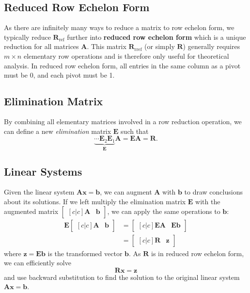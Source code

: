 \documentclass{article}
\begin{document}
\subsection{Reduced Row Echelon Form}
As there are infinitely many ways to reduce a matrix to row echelon
form, we typically reduce \(\symbf{R}_{\mathrm{ref}}\) further into
\textbf{reduced row echelon form} which is a unique reduction for all
matrices \(\symbf{A}\). This matrix \(\symbf{R}_{\mathrm{rref}}\) (or
simply \(\symbf{R}\)) generally requires \(m \times n\) elementary row
operations and is therefore only useful for theoretical analysis. In
reduced row echelon form, all entries in the same column as a pivot
must be 0, and each pivot must be 1.
\subsection{Elimination Matrix}
By combining all elementary matrices involved in a row reduction
operation, we can define a new \textit{elimination} matrix
\(\symbf{E}\) such that
\begin{equation*}
    \underbrace{\cdots \symbf{E}_2 \symbf{E}_1}_{\symbf{E}} \symbf{A} = \symbf{E} \symbf{A} = \symbf{R}.
\end{equation*}
\subsection{Linear Systems}
Given the linear system \(\symbf{A} \symbf{x} = \symbf{b}\), we can
augment \(\symbf{A}\) with \(\symbf{b}\) to draw conclusions about its
solutions. If we left multiply the elimination matrix \(\symbf{E}\)
with the augmented matrix \(
\begin{bmatrix}[c|c]
    \symbf{A} & \symbf{b}
\end{bmatrix}
\),
we can apply the same operations to \(\symbf{b}\):
\begin{align*}
    \symbf{E}
    \begin{bmatrix}[c|c]
        \symbf{A} & \symbf{b}
    \end{bmatrix}
     & =
    \begin{bmatrix}[c|c]
        \symbf{E} \symbf{A} & \symbf{E} \symbf{b}
    \end{bmatrix}
    \\
     & =
    \begin{bmatrix}[c|c]
        \symbf{R} & \symbf{z}
    \end{bmatrix}
\end{align*}
where \(\symbf{z} = \symbf{E} \symbf{b}\) is the transformed vector
\(\symbf{b}\). As \(\symbf{R}\) is in reduced row echelon form, we can
efficiently solve
\begin{equation*}
    \symbf{R} \symbf{x} = \symbf{z}
\end{equation*}
and use backward substitution to find the solution to the original
linear system \(\symbf{A} \symbf{x} = \symbf{b}\).
\end{document}
